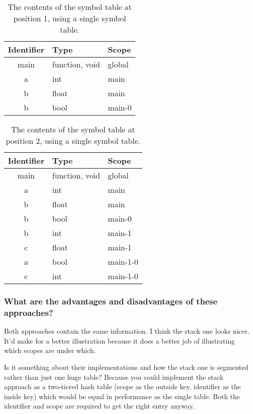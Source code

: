 \begin{table}[H]
\begin{tabular}{|c|l|l|}
	\hline
	Identifier & Type			& Scope \\ \hline
	main	& function, void& global \\
	a		& int			& main	\\
	b		& float			& main	\\
	b		& bool			& main-0 \\
	\hline
\end{tabular}
\label{tab:2-b-1}
\caption{The contents of the symbol table at position 1, using a single symbol table.}
\end{table}

\begin{table}[H]
\begin{tabular}{|c|l|l|}
	\hline
	Identifier& Type			& Scope \\ \hline
	main	& function, void& global \\
	a		& int			& main	\\
	b		& float			& main	\\
	b		& bool			& main-0 \\
	b		& int			& main-1 \\
	c		& float			& main-1 \\
	a		& bool			& main-1-0 \\
	c		& int			& main-1-0 \\
	\hline
\end{tabular}
\label{tab:2-b-2}
\caption{The contents of the symbol table at position 2, using a single symbol table.}
\end{table}

\subsubsection{What are the advantages and disadvantages of these approaches?}
Both approaches contain the same information.
I think the stack one looks nicer.
It'd make for a better illustration because it does a better job of illustrating which scopes are under which.

Is it something about their implementations and how the stack one is segmented rather than just one huge table?
Because you could implement the stack approach as a two-tiered hash table (scope as the outside key, identifier as the inside key) which would be equal in performance as the single table.
Both the identifier and scope are required to get the right entry anyway.

